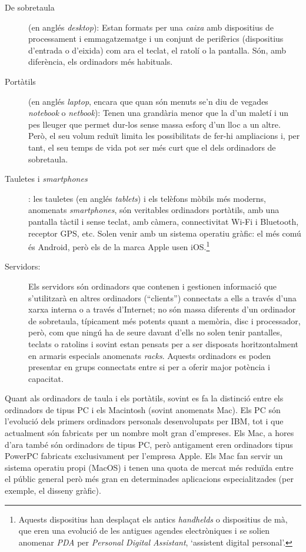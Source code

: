 \begin{description}
\item[De sobretaula] (en anglés \emph{desktop}): Estan formats per una
  \emph{caixa} amb dispositius de processament i emmagatzematge i un
  conjunt de perifèrics (dispositius d'entrada o d'eixida) com ara el
  teclat, el ratolí o la pantalla.  Són, amb diferència, els
  ordinadors més habituals.
\item[Portàtils] (en anglés \emph{laptop}, encara que quan són menuts
  se'n diu de vegades \emph{notebook} o \emph{netbook}): Tenen una
  grandària menor que la d'un maletí i un pes lleuger que permet
  dur-los sense massa esforç d'un lloc a un altre. Però, el seu volum
  reduït limita les possibilitats de fer-hi ampliacions i, per tant,
  el seu temps de vida pot ser més curt que el dels ordinadors de
  sobretaula. 
\item[Tauletes i \emph{smartphones}]: les tauletes (en anglés
  \emph{tablets}) i els telèfons mòbils més moderns, anomenats
  \emph{smartphones}, són veritables ordinadors por\-tà\-tils, amb una
  pantalla tàctil i sense teclat, amb càmera, connectivitat Wi-Fi i
  Bluetooth, receptor GPS, etc. Solen venir amb un sistema operatiu
  gràfic: el més comú és Android, però els de la marca Apple usen
  iOS.\footnote{Aquests dispositius han desplaçat els antics
    \emph{handhelds} o dispositius de mà, que eren una evolució de les
    antigues agendes electròniques i se solien anomenar \emph{PDA} per
    \emph{Personal Digital Assistant}, `assistent digital personal'.}

\item[Servidors:] Els servidors són ordinadors que contenen i
  gestionen informació que s'utilitzarà en altres ordinadors
  (``clients'') connectats a ells a través d'una xarxa interna o a
  través d'Internet; no són massa diferents d'un ordinador de
  sobretaula, típicament més potents quant a memòria, disc i
  processador, però, com que ningú ha de seure davant d'ells no solen
  tenir pantalles, teclats o ratolins i sovint estan pensats per a ser
  disposats horitzontalment en armaris especials anomenats
  \emph{racks}.  Aquests ordinadors es poden presentar en grups
  connectats entre si per a oferir major potència i capacitat.
\end{description}

Quant als ordinadors de taula i els portàtils, sovint es fa la
distinció entre els ordinadors de tipus PC i els Macintosh (sovint
anomenats Mac). Els PC són l'evolució dels primers ordinadors
personals desenvolupats per IBM, tot i que actualment són fabricats
per un nombre molt gran d'empreses. Els Mac, a hores d'ara també són
ordinadors de tipus PC, però antigament eren ordinadors tipus PowerPC
fabricats exclusivament per l'empresa Apple. Els Mac fan servir un
sistema operatiu propi (MacOS) i tenen una quota de mercat més reduïda
entre el públic general però més gran en determinades aplicacions
especialitzades (per exemple, el disseny gràfic).

